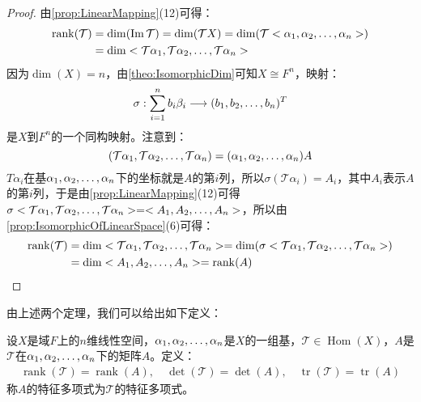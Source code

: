 \begin{proof}
	由\cref{prop:LinearMapping}(12)可得：
	\begin{align*}
		\operatorname{rank}(\mathcal{T})&=\dim(\operatorname{Im}\mathcal{T})=\dim(\mathcal{T}X)=\dim(\mathcal{T}<\alpha_1, \alpha_2, \dots, \alpha_{n}>) \\
		&=\dim<\mathcal{T}\alpha_1, \mathcal{T}\alpha_2, \dots, \mathcal{T}\alpha_{n}>
	\end{align*}
	因为$\dim(X)=n$，由\cref{theo:IsomorphicDim}可知$X\cong F^n$，映射：
	\begin{equation*}
		\sigma:\sum_{i=1}^{n}b_i\beta_i\longrightarrow(b_1, b_2, \dots, b_{n})^T
	\end{equation*}
	是$X$到$F^n$的一个同构映射。注意到：
	\begin{equation*}
		(\mathcal{T}\alpha_1, \mathcal{T}\alpha_2, \dots, \mathcal{T}\alpha_{n})=(\alpha_1, \alpha_2, \dots, \alpha_{n})A
	\end{equation*}
	$T\alpha_i$在基$\alpha_1, \alpha_2, \dots, \alpha_{n}$下的坐标就是$A$的第$i$列，所以$\sigma(\mathcal{T}\alpha_i)=A_i$，其中$A_i$表示$A$的第$i$列，于是由\cref{prop:LinearMapping}(12)可得$\sigma<\mathcal{T}\alpha_1, \mathcal{T}\alpha_2, \dots, \mathcal{T}\alpha_{n}>=<A_1, A_2, \dots, A_{n}>$，所以由\cref{prop:IsomorphicOfLinearSpace}(6)可得：
	\begin{align*}
		\operatorname{rank}(\mathcal{T})&=\dim<\mathcal{T}\alpha_1, \mathcal{T}\alpha_2, \dots, \mathcal{T}\alpha_{n}>=\dim(\sigma<\mathcal{T}\alpha_1, \mathcal{T}\alpha_2, \dots, \mathcal{T}\alpha_{n}>) \\
		&=\dim<A_1, A_2, \dots, A_{n}>=\operatorname{rank}(A)\qedhere
	\end{align*}
\end{proof}
由上述两个定理，我们可以给出如下定义：
\begin{definition}
	设$X$是域$F$上的$n$维线性空间，$\alpha_1, \alpha_2, \dots, \alpha_{n}$是$X$的一组基，$\mathcal{T}\in\operatorname{Hom}(X)$，$A$是$\mathcal{T}$在$\alpha_1, \alpha_2, \dots, \alpha_{n}$下的矩阵$A$。定义：
	\begin{gather*}
		\operatorname{rank}(\mathcal{T})=\operatorname{rank}(A),\quad\det(\mathcal{T})=\det(A),\quad\operatorname{tr}(\mathcal{T})=\operatorname{tr}(A)
	\end{gather*}
	称$A$的特征多项式为$\mathcal{T}$的特征多项式。
\end{definition}

